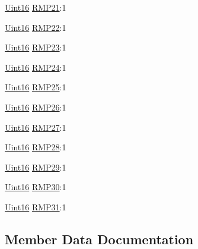 \begin{DoxyCompactItemize}
\hyperlink{_d_s_p2833x___device_8h_a59a9f6be4562c327cbfb4f7e8e18f08b}{Uint16} \hyperlink{struct_c_a_n_r_m_p___b_i_t_s_a4dd9da72276c10a6d20e90501f8d0a04}{R\+M\+P21}\+:1
\item 
\hyperlink{_d_s_p2833x___device_8h_a59a9f6be4562c327cbfb4f7e8e18f08b}{Uint16} \hyperlink{struct_c_a_n_r_m_p___b_i_t_s_a0d85b25c306185c0963ba4fec2544f5e}{R\+M\+P22}\+:1
\item 
\hyperlink{_d_s_p2833x___device_8h_a59a9f6be4562c327cbfb4f7e8e18f08b}{Uint16} \hyperlink{struct_c_a_n_r_m_p___b_i_t_s_a63518d1efca745c816a514d50cc3f50d}{R\+M\+P23}\+:1
\item 
\hyperlink{_d_s_p2833x___device_8h_a59a9f6be4562c327cbfb4f7e8e18f08b}{Uint16} \hyperlink{struct_c_a_n_r_m_p___b_i_t_s_a75423aaba1c98a4e5bb41f6af157f885}{R\+M\+P24}\+:1
\item 
\hyperlink{_d_s_p2833x___device_8h_a59a9f6be4562c327cbfb4f7e8e18f08b}{Uint16} \hyperlink{struct_c_a_n_r_m_p___b_i_t_s_ab8a4209cfe35b0513af5dcdaaf9ba10e}{R\+M\+P25}\+:1
\item 
\hyperlink{_d_s_p2833x___device_8h_a59a9f6be4562c327cbfb4f7e8e18f08b}{Uint16} \hyperlink{struct_c_a_n_r_m_p___b_i_t_s_a1dc8746bb2ffa6364c72ed8ad00ebe66}{R\+M\+P26}\+:1
\item 
\hyperlink{_d_s_p2833x___device_8h_a59a9f6be4562c327cbfb4f7e8e18f08b}{Uint16} \hyperlink{struct_c_a_n_r_m_p___b_i_t_s_aa85ac9a729bda2f1c926cfba3f7783ec}{R\+M\+P27}\+:1
\item 
\hyperlink{_d_s_p2833x___device_8h_a59a9f6be4562c327cbfb4f7e8e18f08b}{Uint16} \hyperlink{struct_c_a_n_r_m_p___b_i_t_s_a5d47e0b6a6a96a26b5b0fc9ec3d6a333}{R\+M\+P28}\+:1
\item 
\hyperlink{_d_s_p2833x___device_8h_a59a9f6be4562c327cbfb4f7e8e18f08b}{Uint16} \hyperlink{struct_c_a_n_r_m_p___b_i_t_s_a0ca5e4900e7d00ec337d051250e2557e}{R\+M\+P29}\+:1
\item 
\hyperlink{_d_s_p2833x___device_8h_a59a9f6be4562c327cbfb4f7e8e18f08b}{Uint16} \hyperlink{struct_c_a_n_r_m_p___b_i_t_s_a1c8d468979a066a169fe464e29e93250}{R\+M\+P30}\+:1
\item 
\hyperlink{_d_s_p2833x___device_8h_a59a9f6be4562c327cbfb4f7e8e18f08b}{Uint16} \hyperlink{struct_c_a_n_r_m_p___b_i_t_s_a2dc075d20d00cba12edfaaf04fc80051}{R\+M\+P31}\+:1
\end{DoxyCompactItemize}


\subsection{Member Data Documentation}
\hypertarget{struct_c_a_n_r_m_p___b_i_t_s_a86840e17e257fcd2fa38618d9751f542}{}

